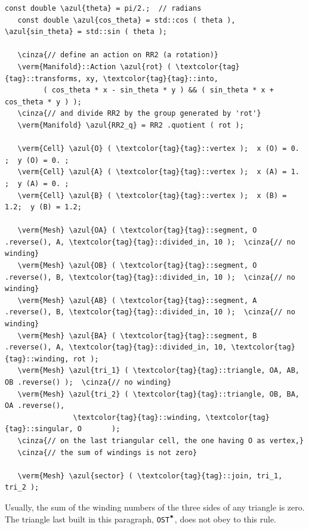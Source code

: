 \begin{Verbatim}[commandchars=\\\{\},formatcom=\small\tt,frame=single,
   label=parag-\ref{\numb section 7.\numb parag 12}.cpp,rulecolor=\color{coment},
   baselinestretch=0.94,framesep=2mm                                             ]
   const double \azul{theta} = pi/2.;  // radians
   const double \azul{cos_theta} = std::cos ( theta ), \azul{sin_theta} = std::sin ( theta );
	
   \cinza{// define an action on RR2 (a rotation)}
   \verm{Manifold}::Action \azul{rot} ( \textcolor{tag}{tag}::transforms, xy, \textcolor{tag}{tag}::into,
         ( cos_theta * x - sin_theta * y ) && ( sin_theta * x + cos_theta * y ) );
   \cinza{// and divide RR2 by the group generated by 'rot'}
   \verm{Manifold} \azul{RR2_q} = RR2 .quotient ( rot );

   \verm{Cell} \azul{O} ( \textcolor{tag}{tag}::vertex );  x (O) = 0. ;  y (O) = 0. ;
   \verm{Cell} \azul{A} ( \textcolor{tag}{tag}::vertex );  x (A) = 1. ;  y (A) = 0. ;
   \verm{Cell} \azul{B} ( \textcolor{tag}{tag}::vertex );  x (B) = 1.2;  y (B) = 1.2;

   \verm{Mesh} \azul{OA} ( \textcolor{tag}{tag}::segment, O .reverse(), A, \textcolor{tag}{tag}::divided_in, 10 );  \cinza{// no winding}
   \verm{Mesh} \azul{OB} ( \textcolor{tag}{tag}::segment, O .reverse(), B, \textcolor{tag}{tag}::divided_in, 10 );  \cinza{// no winding}
   \verm{Mesh} \azul{AB} ( \textcolor{tag}{tag}::segment, A .reverse(), B, \textcolor{tag}{tag}::divided_in, 10 );  \cinza{// no winding}
   \verm{Mesh} \azul{BA} ( \textcolor{tag}{tag}::segment, B .reverse(), A, \textcolor{tag}{tag}::divided_in, 10, \textcolor{tag}{tag}::winding, rot );
   \verm{Mesh} \azul{tri_1} ( \textcolor{tag}{tag}::triangle, OA, AB, OB .reverse() );  \cinza{// no winding}
   \verm{Mesh} \azul{tri_2} ( \textcolor{tag}{tag}::triangle, OB, BA, OA .reverse(),
                \textcolor{tag}{tag}::winding, \textcolor{tag}{tag}::singular, O       );
   \cinza{// on the last triangular cell, the one having O as vertex,}
   \cinza{// the sum of windings is not zero}

   \verm{Mesh} \azul{sector} ( \textcolor{tag}{tag}::join, tri_1, tri_2 );
\end{Verbatim}

Usually, the sum of the winding numbers of the three sides of any triangle is zero.
The triangle last built in this paragraph, {\small\tt OST$^{\mbox{\small\tt *}}$},
does not obey to this rule.


